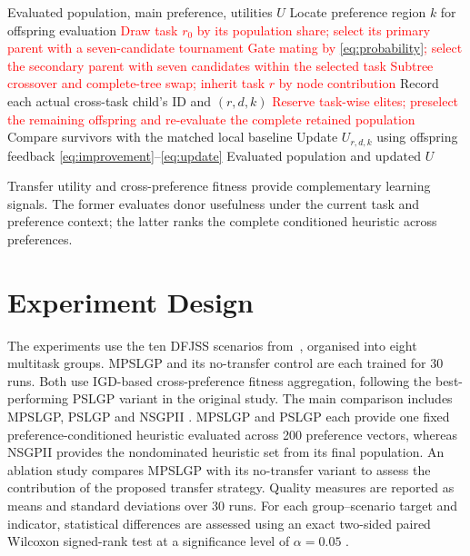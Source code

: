 \documentclass[10pt,journal]{IEEEtran}
\newcommand{\key}[1]{\textcolor{red}{#1}}
\begin{document}
\begin{algorithm}[t]
\caption{MPSLGP transfer and feedback}
\label{alg:mpslgp}
\footnotesize
\begin{algorithmic}[1]
\REQUIRE Evaluated population, main preference, utilities $U$
\STATE Locate preference region $k$ for offspring evaluation
    \STATE \key{Draw task $r_0$ by its population share; select its primary parent with a seven-candidate tournament}
    \STATE \key{Gate mating by \eqref{eq:probability}; select the secondary parent with seven candidates within the selected task}
    \STATE \key{Subtree crossover and complete-tree swap; inherit task $r$ by node contribution}
    \STATE Record each actual cross-task child's ID and $(r,d,k)$
\ENDFOR
\STATE \key{Reserve task-wise elites; preselect the remaining offspring and re-evaluate the complete retained population}
    \STATE Compare survivors with the matched local baseline
    \STATE Update $U_{r,d,k}$ using offspring feedback \eqref{eq:improvement}--\eqref{eq:update}
\ENDFOR
\RETURN Evaluated population and updated $U$
\end{algorithmic}
\end{algorithm}

Transfer utility and cross-preference fitness provide complementary learning signals. The former evaluates donor usefulness under the current task and preference context; the latter ranks the complete conditioned heuristic across preferences.

\section{Experiment Design}
\label{sec:experiment-design}
The experiments use the ten DFJSS scenarios from~\cite{xu2026pslgp}, organised into eight multitask groups. MPSLGP and its no-transfer control are each trained for 30 runs. Both use IGD-based cross-preference fitness aggregation, following the best-performing PSLGP variant in the original study. The main comparison includes MPSLGP, PSLGP \cite{xu2026pslgp} and NSGPII \cite{zhang2019evolving}. MPSLGP and PSLGP each provide one fixed preference-conditioned heuristic evaluated across 200 preference vectors, whereas NSGPII provides the nondominated heuristic set from its final population. An ablation study compares MPSLGP with its no-transfer variant to assess the contribution of the proposed transfer strategy. Quality measures are reported as means and standard deviations over 30 runs. For each group--scenario target and indicator, statistical differences are assessed using an exact two-sided paired Wilcoxon signed-rank test at a significance level of $\alpha=0.05$ \cite{zimmerman1993relative}.
\end{document}
